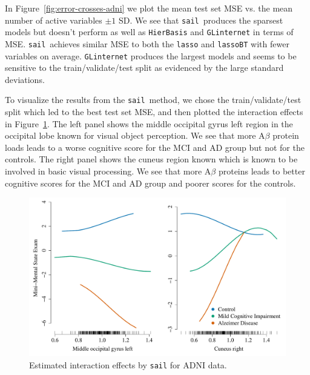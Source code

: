 \documentclass[12pt,letter]{article}\usepackage[]{graphicx}\usepackage[]{color}
\newenvironment{knitrout}{}{} %
\newcommand{\sail}{\texttt{sail}}
\begin{document}
In Figure~\ref{fig:error-crosses-adni} we plot the mean test set MSE vs. the mean number of active variables $\pm 1$ SD. We see that \sail ~produces the sparsest models but doesn't perform as well as \texttt{HierBasis} and \texttt{GLinternet} in terms of MSE. \sail ~achieves similar MSE to both the \texttt{lasso} and \texttt{lassoBT} with fewer variables on average. \texttt{GLinternet} produces the largest models and seems to be sensitive to the train/validate/test split as evidenced by the large standard deviations. 

To visualize the results from the \sail ~method, we chose the train/validate/test split which led to the best test set MSE, and then plotted the interaction effects in Figure~\ref{fig:plot-inter-adni}. The left panel shows the middle occipital gyrus left region in the occipital lobe known for visual object perception. We see that more A$\beta$ protein loads leads to a worse cognitive score for the MCI and AD group but not for the controls. The right panel shows the cuneus region known which is known to be involved in basic visual processing. We see that more A$\beta$ proteins leads to better cognitive scores for the MCI and AD group and poorer scores for the controls. 



\begin{knitrout}\scriptsize
{}\color{fgcolor}\begin{figure}[H]

{\centering \includegraphics[width=1\linewidth]{figure/plot-inter-adni-1} 

}

\caption[Estimated interaction effects by \texttt{sail} for ADNI data]{Estimated interaction effects by \texttt{sail} for ADNI data.}\label{fig:plot-inter-adni}
\end{figure}


\end{knitrout}
\end{document}
